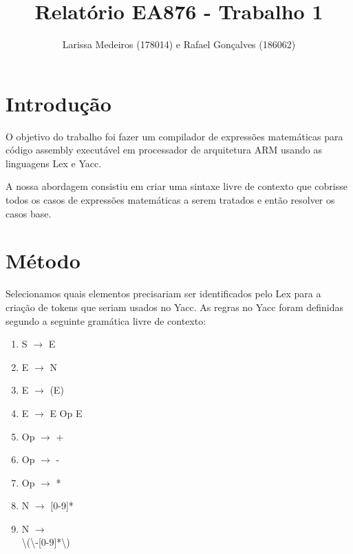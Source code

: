 \documentclass[a4paper, 11pt]{article}
\title{Relatório EA876 - Trabalho 1}
\author{Larissa Medeiros (178014) e Rafael Gonçalves (186062)}
\date{}
\begin{document}
\maketitle
\begin{multicols*}{2}

\section*{Introdução}

    O objetivo do trabalho foi fazer um compilador de expressões matemáticas para código assembly executável em processador de arquitetura ARM usando as linguagens Lex e Yacc.

A nossa abordagem consistiu em criar uma sintaxe livre de contexto que cobrisse todos os casos de expressões matemáticas a serem tratados e então resolver os casos base.

\section*{Método}

Selecionamos quais elementos precisariam ser identificados pelo Lex para a criação de tokens que seriam usados no Yacc. As regras no Yacc foram definidas segundo a seguinte gramática livre de contexto:

\begin{multicols*}{2}
\setlength{\columnsep}{0em}
\begin{enumerate}
\item
S $\rightarrow$ E

\item
E $\rightarrow$ N

\item
E $\rightarrow$ (E)

\item
E $\rightarrow$ E Op E

\item
Op $\rightarrow$ +

\item
Op $\rightarrow$ -

\item
Op $\rightarrow$ *

\item
N $\rightarrow$ [0-9]*

\item
N $\rightarrow$ \\ \textbackslash(\textbackslash-[0-9]*\textbackslash)

\end{enumerate}


\end{multicols*}
\end{multicols*}
\end{document}
